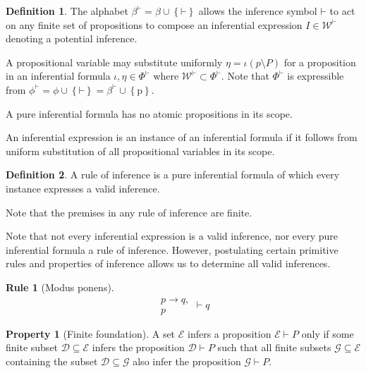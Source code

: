 \documentclass{amsbook}
\newcommand{\setsm}[1]{\left\{#1\right\}}
\newcommand{\wffs}{\mathcal W}
\newcommand{\infers}{\mathrel\vdash}
\theoremstyle{definition}
\newtheorem{prop}{Property}[section]
\newtheorem{frule}{Rule}[chapter]
\newtheorem{dfn}{Definition}[section]
\begin{document}
\begin{dfn}
    The alphabet $\beta^{\mathord\vdash} = \beta \cup \setsm{\mathord\vdash}$ allows the inference symbol $\mathord\vdash$ to act on any finite set of propositions to compose an inferential expression $I \in \wffs^{\mathord\vdash}$ denoting a potential inference.

    A propositional variable may substitute uniformly $\eta = \iota(p \setminus P)$ for a proposition in an inferential formula $\iota, \eta \in \Phi^{\mathord\vdash}$ where $\wffs^{\mathord\vdash} \subset \Phi^{\mathord\vdash}$. Note that $\Phi^{\mathord\vdash}$ is expressible from $\phi^{\mathord\vdash} = \phi \cup \setsm{\mathord\vdash} = \beta^{\mathord\vdash} \cup \setsm{\mathrm p}$.

    A pure inferential formula has no atomic propositions in its scope.

    An inferential expression is an instance of an inferential formula if it follows from uniform substitution of all propositional variables in its scope.
\end{dfn}

\begin{dfn}
    A rule of inference is a pure inferential formula of which every instance expresses a valid inference.
\end{dfn}

Note that the premises in any rule of inference are finite.

Note that not every inferential expression is a valid inference, nor every pure inferential formula a rule of inference. However, postulating certain primitive rules and properties of inference allows us to determine all valid inferences.

\begin{frule}[Modus ponens]
    $$\begin{aligned}p \rightarrow q, \\ p\end{aligned} \infers q$$
\end{frule}

\begin{prop}[Finite foundation]
    A set $\mathcal E$ infers a proposition $\mathcal E \infers P$ only if some finite subset $\mathcal D \subseteq \mathcal E$ infers the proposition $\mathcal D \infers P$ such that all finite subsets $\mathcal G \subseteq \mathcal E$ containing the subset $\mathcal D \subseteq \mathcal G$ also infer the proposition $\mathcal G \infers P$.
\end{prop}
\end{document}
